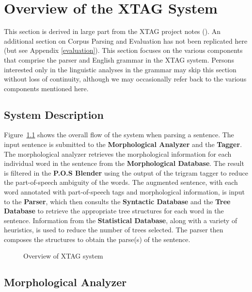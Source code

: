 \chapter{Overview of the XTAG System}
\label{overview}

This section is derived in large part from the XTAG project notes
(\cite{Xtag-notes}).  An additional section on Corpus Parsing and Evaluation
has not been replicated here (but see Appendix \ref{evaluation}). This section
focuses on the various components that comprise the parser and English grammar
in the XTAG system.  Persons interested only in the linguistic analyses in the
grammar may skip this section without loss of continuity, although we may
occasionally refer back to the various components mentioned here.

\section{System Description}

Figure~{\ref{flowchart}} shows the overall flow of the system when parsing a
sentence. The input sentence is submitted to the {\bf Morphological Analyzer}
and the {\bf Tagger}. The morphological analyzer retrieves the morphological
information for each individual word in the sentence from the {\bf
Morphological Database}. The result is filtered in the {\bf P.O.S Blender}
using the output of the trigram tagger to reduce the part-of-speech ambiguity
of the words. The augmented sentence, with each word annotated with
part-of-speech tags and morphological information, is input to the {\bf
Parser}, which then consults the {\bf Syntactic Database} and the {\bf Tree
Database} to retrieve the appropriate tree structures for each word in the
sentence.  Information from the {\bf Statistical Database}, along with a
variety of heuristics, is used to reduce the number of trees selected. The
parser then composes the structures to obtain the parse(s) of the sentence.

\begin{figure}[htb]
\centering
\mbox{}
{}
\caption{Overview of XTAG system}
\label{flowchart}
\end{figure}

\section{Morphological Analyzer}

